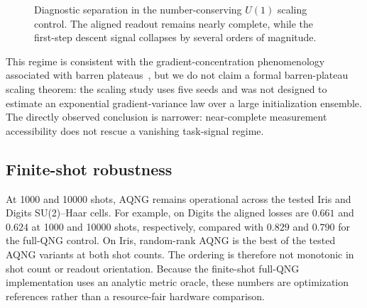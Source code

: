 \begin{figure}[t]
\centering
{}
\caption{Diagnostic separation in the number-conserving $U(1)$ scaling control. The aligned readout remains nearly complete, while the first-step descent signal collapses by several orders of magnitude.}
\label{fig:u1_signal}
\end{figure}

This regime is consistent with the gradient-concentration phenomenology associated with barren plateaus~\cite{McClean2018}, but we do not claim a formal barren-plateau scaling theorem: the scaling study uses five seeds and was not designed to estimate an exponential gradient-variance law over a large initialization ensemble. The directly observed conclusion is narrower: near-complete measurement accessibility does not rescue a vanishing task-signal regime.

\subsection{Finite-shot robustness}
At 1000 and 10000 shots, AQNG remains operational across the tested Iris and Digits SU(2)--Haar cells. For example, on Digits the aligned losses are $0.661$ and $0.624$ at 1000 and 10000 shots, respectively, compared with $0.829$ and $0.790$ for the full-QNG control. On Iris, random-rank AQNG is the best of the tested AQNG variants at both shot counts. The ordering is therefore not monotonic in shot count or readout orientation. Because the finite-shot full-QNG implementation uses an analytic metric oracle, these numbers are optimization references rather than a resource-fair hardware comparison.
